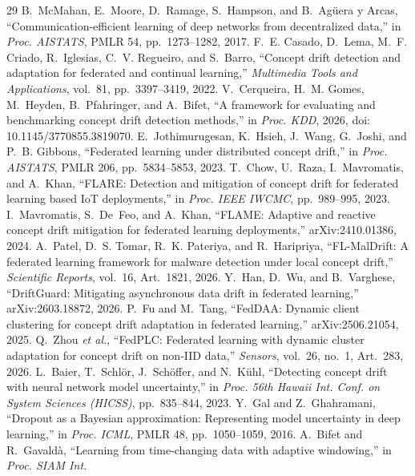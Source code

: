 \documentclass[conference]{IEEEtran}
\begin{document}
\begin{thebibliography}{29}
 B.~McMahan, E.~Moore, D.~Ramage, S.~Hampson, and
B.~Ag{\"u}era y Arcas, ``Communication-efficient learning of deep networks
from decentralized data,'' in \emph{Proc. AISTATS}, PMLR 54,
pp.~1273--1282, 2017.
 F.~E. Casado, D.~Lema, M.~F. Criado, R.~Iglesias,
C.~V. Regueiro, and S.~Barro, ``Concept drift detection and adaptation for
federated and continual learning,'' \emph{Multimedia Tools and
Applications}, vol.~81, pp.~3397--3419, 2022.
 V.~Cerqueira, H.~M. Gomes, M.~Heyden,
B.~Pfahringer, and A.~Bifet, ``A framework for evaluating and benchmarking
concept drift detection methods,'' in \emph{Proc. KDD}, 2026,
doi: 10.1145/3770855.3819070.
 E.~Jothimurugesan, K.~Hsieh, J.~Wang,
G.~Joshi, and P.~B. Gibbons, ``Federated learning under distributed concept
drift,'' in \emph{Proc. AISTATS}, PMLR 206, pp.~5834--5853, 2023.
 T.~Chow, U.~Raza, I.~Mavromatis, and A.~Khan, ``FLARE:
Detection and mitigation of concept drift for federated learning based IoT
deployments,'' in \emph{Proc. IEEE IWCMC}, pp.~989--995, 2023.
 I.~Mavromatis, S.~De~Feo, and A.~Khan, ``FLAME:
Adaptive and reactive concept drift mitigation for federated learning
deployments,'' arXiv:2410.01386, 2024.
 A.~Patel, D.~S. Tomar, R.~K. Pateriya, and
R.~Haripriya, ``FL-MalDrift: A federated learning framework for malware
detection under local concept drift,'' \emph{Scientific Reports},
vol.~16, Art.~1821, 2026.
 Y.~Han, D.~Wu, and B.~Varghese, ``DriftGuard: Mitigating
asynchronous data drift in federated learning,'' arXiv:2603.18872, 2026.
 P.~Fu and M.~Tang, ``FedDAA: Dynamic client clustering for
concept drift adaptation in federated learning,'' arXiv:2506.21054, 2025.
 Q.~Zhou \emph{et al.}, ``FedPLC: Federated learning with
dynamic cluster adaptation for concept drift on non-IID data,''
\emph{Sensors}, vol.~26, no.~1, Art.~283, 2026.
 L.~Baier, T.~Schl{\"o}r, J.~Sch{\"o}ffer, and N.~K{\"u}hl,
``Detecting concept drift with neural network model uncertainty,'' in
\emph{Proc. 56th Hawaii Int. Conf. on System Sciences (HICSS)},
pp.~835--844, 2023.
 Y.~Gal and Z.~Ghahramani, ``Dropout as a Bayesian
approximation: Representing model uncertainty in deep learning,'' in
\emph{Proc. ICML}, PMLR 48, pp.~1050--1059, 2016.
 A.~Bifet and R.~Gavald{\`a}, ``Learning from
time-changing data with adaptive windowing,'' in \emph{Proc. SIAM Int.
}
\end{thebibliography}
\end{document}
